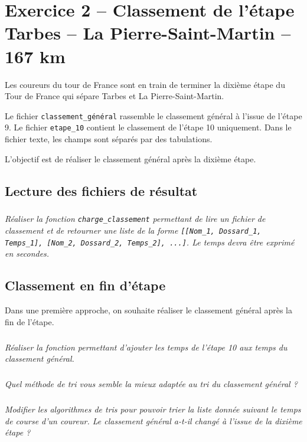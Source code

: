 \else\fi






\section*{Exercice 2 -- Classement de l'étape Tarbes -- La Pierre-Saint-Martin -- 167 km}


\ifprof
\else


Les coureurs du tour de France sont en train de terminer la dixième étape du Tour de France qui sépare Tarbes et La 
Pierre-Saint-Martin. 

Le fichier \texttt{classement\_général} rassemble le classement général à l'issue de l'étape 9. Le fichier \texttt{etape\_10} contient le classement de l'étape 10 uniquement. Dans le fichier texte, les champs sont séparés par des tabulations.


\begin{obj}
L'objectif est de réaliser le classement général après la dixième étape. 
\end{obj}

\subsection*{Lecture des fichiers de résultat}

\setcounter{exo}{0}
\subparagraph{}
\textit{Réaliser la fonction \texttt{charge\_classement} permettant de lire un fichier de classement 
et de retourner une liste de la forme \texttt{[[Nom\_1, Dossard\_1, Temps\_1], [Nom\_2, Dossard\_2, Temps\_2], ...]}. Le temps devra être exprimé en secondes.}



\subsection*{Classement en fin d'étape}
Dans une première approche, on souhaite réaliser le classement général après la fin de l'étape. 

\subparagraph{}
\textit{Réaliser la fonction permettant d'ajouter les temps de l'étape 10 aux temps du classement général.}

\subparagraph{}
\textit{Quel méthode de tri vous semble la mieux adaptée au tri du classement général ?}

\subparagraph{}
\textit{Modifier les algorithmes de tris pour pouvoir trier la liste donnée suivant le temps de course d'un coureur. Le classement général a-t-il changé à l'issue de la dixième étape ?}


